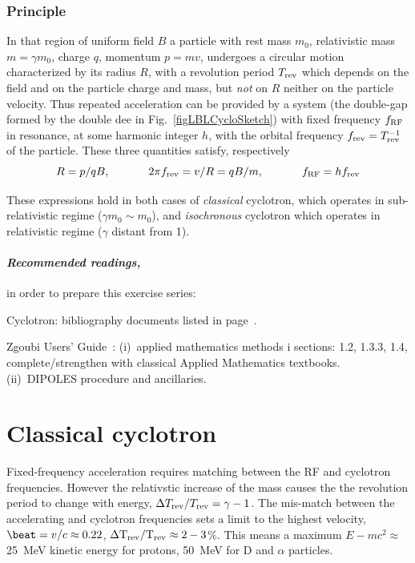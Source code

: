 \subsubsection*{Principle}

In that region of uniform field $B$ a  particle with rest mass $m_0$, 
relativistic mass $m=\gamma m_0$, charge $q$, momentum $p=mv$, undergoes a circular motion
characterized by its radius $R$, with a revolution period $T_{\rm rev}$ which depends on the field 
and on the particle charge and mass, but \emph{not} on $R$ neither on the particle velocity. 
Thus repeated acceleration can be provided by a system (the double-gap formed by the double dee in Fig.~\ref{figLBLCycloSketch}) 
with fixed frequency $f_{\rm RF}$ in resonance, at some harmonic integer $h$, 
 with the orbital frequency $f_{\rm rev}=T^{-1}_{\rm rev}$ of the particle. These three quantities satisfy, respectively 
\begin{equation}
\label{EqRCyclo}
 R = p / qB, \hspace{.1\linewidth} 2\pi f_{\rm rev} = v/R = q B / m, \hspace{.1\linewidth} f_{\rm RF} = h f_{\rm rev}
\end{equation}

These expressions hold in both cases of  \emph{classical} cyclotron, which  operates in 
 sub-relativistic regime ($\gamma m_0\sim m_0$), 
and  \emph{isochronous} cyclotron which operates in  relativistic regime ($\gamma $ distant from 1).  


\paragraph {\sl Recommended readings,} in order to prepare this exercise series:

Cyclotron: bibliography documents listed in page~\pageref{SecBiblioCyclotron}.

Zgoubi Users' Guide~: (i)~applied mathematics methods i sections: 1.2, 1.3.3, 1.4,  
complete/strengthen with classical Applied Mathematics textbooks. (ii)~DIPOLES procedure and ancillaries.



\section{Classical cyclotron \label{secCycloClass}}

Fixed-frequency acceleration requires  matching between the RF and cyclotron frequencies. 
However the relativstic increase of the mass causes the 
 the revolution period to change with energy, $\Delta T_{\rm rev}/T_{\rm rev} = \gamma-1 $.  
The mis-match between the accelerating and cyclotron frequencies 
sets a limit to the highest velocity, $\beat=v/c\approx 0.22$,  $\rm \Delta T_{\rm rev}/T_{\rm rev} \approx 2-3$\%.  
This means a maximum $E-mc^2 \approx$25~MeV kinetic energy for protons, 50~MeV for D and $\alpha$ particles. 

